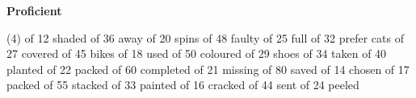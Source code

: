 \documentclass[17pt,a4paper,landscape]{extarticle}
\begin{document}
\sffamily
\boldmath

\boldmath

\boldmath

\boldmath

\boldmath

\boldmath

\boldmath

\boldmath

\boldmath

\boldmath

\boldmath

\boldmath

\boldmath

\boldmath

\boldmath

\boldmath

\boldmath

\boldmath

\boldmath

\boldmath

\boldmath

\boldmath

\vspace*{0.4em}
{\LARGE \textbf{Proficient}}
\begin{tasks}(4)
 of 12 shaded
 of 36 away
 of 20 spins
 of 48 faulty
 of 25 full
 of 32 prefer cats
 of 27 covered
 of 45 bikes
 of 18 used
 of 50 coloured
 of 29 shoes
 of 34 taken
 of 40 planted
 of 22 packed
 of 60 completed
 of 21 missing
 of 80 saved
 of 14 chosen
 of 17 packed
 of 55 stacked
 of 33 painted
 of 16 cracked
 of 44 sent
 of 24 peeled
\end{tasks}
\end{document}
